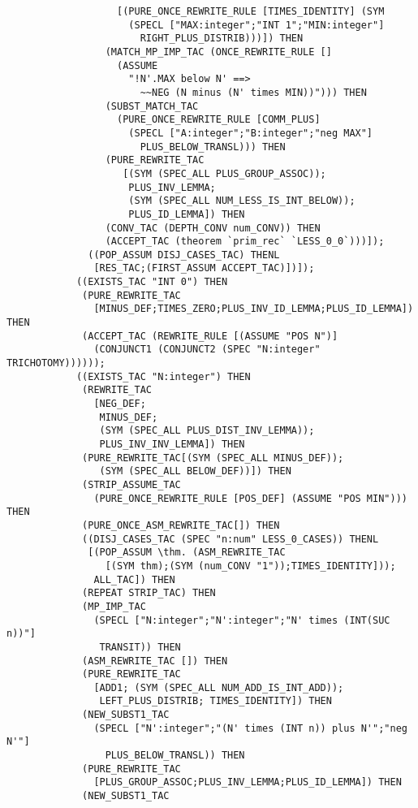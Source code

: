 \begin{verbatim}
                   [(PURE_ONCE_REWRITE_RULE [TIMES_IDENTITY] (SYM
                     (SPECL ["MAX:integer";"INT 1";"MIN:integer"]
                       RIGHT_PLUS_DISTRIB)))]) THEN
                 (MATCH_MP_IMP_TAC (ONCE_REWRITE_RULE []
                   (ASSUME
                     "!N'.MAX below N' ==>
                       ~~NEG (N minus (N' times MIN))"))) THEN
                 (SUBST_MATCH_TAC
                   (PURE_ONCE_REWRITE_RULE [COMM_PLUS]
                     (SPECL ["A:integer";"B:integer";"neg MAX"]
                       PLUS_BELOW_TRANSL))) THEN
                 (PURE_REWRITE_TAC
                    [(SYM (SPEC_ALL PLUS_GROUP_ASSOC));
                     PLUS_INV_LEMMA;
                     (SYM (SPEC_ALL NUM_LESS_IS_INT_BELOW));
                     PLUS_ID_LEMMA]) THEN
                 (CONV_TAC (DEPTH_CONV num_CONV)) THEN
                 (ACCEPT_TAC (theorem `prim_rec` `LESS_0_0`)))]);
              ((POP_ASSUM DISJ_CASES_TAC) THENL
               [RES_TAC;(FIRST_ASSUM ACCEPT_TAC)])]);
            ((EXISTS_TAC "INT 0") THEN 
             (PURE_REWRITE_TAC
               [MINUS_DEF;TIMES_ZERO;PLUS_INV_ID_LEMMA;PLUS_ID_LEMMA]) THEN
             (ACCEPT_TAC (REWRITE_RULE [(ASSUME "POS N")]
               (CONJUNCT1 (CONJUNCT2 (SPEC "N:integer" TRICHOTOMY))))));
            ((EXISTS_TAC "N:integer") THEN
             (REWRITE_TAC
               [NEG_DEF;
                MINUS_DEF;
                (SYM (SPEC_ALL PLUS_DIST_INV_LEMMA));
                PLUS_INV_INV_LEMMA]) THEN
             (PURE_REWRITE_TAC[(SYM (SPEC_ALL MINUS_DEF));
                (SYM (SPEC_ALL BELOW_DEF))]) THEN
             (STRIP_ASSUME_TAC
               (PURE_ONCE_REWRITE_RULE [POS_DEF] (ASSUME "POS MIN"))) THEN
             (PURE_ONCE_ASM_REWRITE_TAC[]) THEN
             ((DISJ_CASES_TAC (SPEC "n:num" LESS_0_CASES)) THENL
              [(POP_ASSUM \thm. (ASM_REWRITE_TAC
                 [(SYM thm);(SYM (num_CONV "1"));TIMES_IDENTITY]));
               ALL_TAC]) THEN
             (REPEAT STRIP_TAC) THEN
             (MP_IMP_TAC
               (SPECL ["N:integer";"N':integer";"N' times (INT(SUC n))"]
                TRANSIT)) THEN
             (ASM_REWRITE_TAC []) THEN
             (PURE_REWRITE_TAC
               [ADD1; (SYM (SPEC_ALL NUM_ADD_IS_INT_ADD));
                LEFT_PLUS_DISTRIB; TIMES_IDENTITY]) THEN
             (NEW_SUBST1_TAC
               (SPECL ["N':integer";"(N' times (INT n)) plus N'";"neg N'"]
                 PLUS_BELOW_TRANSL)) THEN
             (PURE_REWRITE_TAC
               [PLUS_GROUP_ASSOC;PLUS_INV_LEMMA;PLUS_ID_LEMMA]) THEN
             (NEW_SUBST1_TAC 

\end{verbatim}
